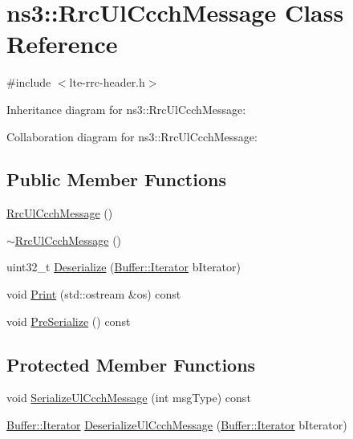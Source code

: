 \hypertarget{classns3_1_1RrcUlCcchMessage}{}\section{ns3\+:\+:Rrc\+Ul\+Ccch\+Message Class Reference}
\label{classns3_1_1RrcUlCcchMessage}


{\ttfamily \#include $<$lte-\/rrc-\/header.\+h$>$}



Inheritance diagram for ns3\+:\+:Rrc\+Ul\+Ccch\+Message\+:


Collaboration diagram for ns3\+:\+:Rrc\+Ul\+Ccch\+Message\+:
\subsection*{Public Member Functions}
\begin{DoxyCompactItemize}
\item 
\hyperlink{classns3_1_1RrcUlCcchMessage_a57b689b22fb31ae99187c8583d49c7e9}{Rrc\+Ul\+Ccch\+Message} ()
\item 
\hyperlink{classns3_1_1RrcUlCcchMessage_a6486ba6d7a5f72a6514a8ab8d806dc10}{$\sim$\+Rrc\+Ul\+Ccch\+Message} ()
\item 
uint32\+\_\+t \hyperlink{classns3_1_1RrcUlCcchMessage_a61b96b11357e6e34d48a3ec1b7d31a38}{Deserialize} (\hyperlink{classns3_1_1Buffer_1_1Iterator}{Buffer\+::\+Iterator} b\+Iterator)
\item 
void \hyperlink{classns3_1_1RrcUlCcchMessage_a6404899247d432e55fab61bf96bc4820}{Print} (std\+::ostream \&os) const 
\item 
void \hyperlink{classns3_1_1RrcUlCcchMessage_aeae6b9253e8d8bdce5df99ef594b7e06}{Pre\+Serialize} () const 
\end{DoxyCompactItemize}
\subsection*{Protected Member Functions}
\begin{DoxyCompactItemize}
\item 
void \hyperlink{classns3_1_1RrcUlCcchMessage_ac6f5ee6f826d83661b2cab01dcd78d5c}{Serialize\+Ul\+Ccch\+Message} (int msg\+Type) const 
\item 
\hyperlink{classns3_1_1Buffer_1_1Iterator}{Buffer\+::\+Iterator} \hyperlink{classns3_1_1RrcUlCcchMessage_a763d3d5779d53fe7244be7a0f25e4cba}{Deserialize\+Ul\+Ccch\+Message} (\hyperlink{classns3_1_1Buffer_1_1Iterator}{Buffer\+::\+Iterator} b\+Iterator)
\end{DoxyCompactItemize}
